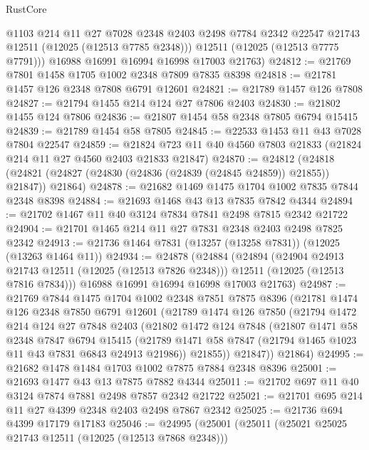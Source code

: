 \begin{lexlean}{RustCore}
\begin{coremodule}
          @1103
          @214
          @11
          @27
          @7028
          @2348
          @2403
          @2498
          @7784
          @2342
          @22547
          @21743
          @12511
          (@12025 (@12513 @7785 @2348)))
        @12511
        (@12025 (@12513 @7775 @7791)))
      @16988
      @16991
      @16994
      @16998
      @17003
      @21763)
@24812 := @21769 @7801 @1458 @1705 @1002 @2348 @7809 @7835 @8398
@24818 := @21781 @1457 @126 @2348 @7808 @6791 @12601
@24821 := @21789 @1457 @126 @7808
@24827 := @21794 @1455 @214 @124 @27 @7806 @2403
@24830 := @21802 @1455 @124 @7806
@24836 := @21807 @1454 @58 @2348 @7805 @6794 @15415
@24839 := @21789 @1454 @58 @7805
@24845 := @22533 @1453 @11 @43 @7028 @7804 @22547
@24859 := @21824 @723 @11 @40 @4560 @7803 @21833 (@21824 @214 @11 @27 @4560 @2403 @21833 @21847)
@24870 := @24812
    (@24818 (@24821 (@24827 (@24830 (@24836 (@24839 (@24845 @24859)) @21855)) @21847)) @21864)
@24878 := @21682 @1469 @1475 @1704 @1002 @7835 @7844 @2348 @8398
@24884 := @21693 @1468 @43 @13 @7835 @7842 @4344
@24894 := @21702 @1467 @11 @40 @3124 @7834 @7841 @2498 @7815 @2342 @21722
@24904 := @21701 @1465 @214 @11 @27 @7831 @2348 @2403 @2498 @7825 @2342
@24913 := @21736 @1464 @7831 (@13257 (@13258 @7831)) (@12025 (@13263 @1464 @11))
@24934 := @24878
    (@24884
      (@24894
        (@24904 @24913 @21743 @12511 (@12025 (@12513 @7826 @2348)))
        @12511
        (@12025 (@12513 @7816 @7834)))
      @16988
      @16991
      @16994
      @16998
      @17003
      @21763)
@24987 := @21769
    @7844
    @1475
    @1704
    @1002
    @2348
    @7851
    @7875
    @8396
    (@21781
      @1474
      @126
      @2348
      @7850
      @6791
      @12601
      (@21789
        @1474
        @126
        @7850
        (@21794
          @1472
          @214
          @124
          @27
          @7848
          @2403
          (@21802
            @1472
            @124
            @7848
            (@21807
              @1471
              @58
              @2348
              @7847
              @6794
              @15415
              (@21789 @1471 @58 @7847 (@21794 @1465 @1023 @11 @43 @7831 @6843 @24913 @21986))
              @21855))
          @21847))
      @21864)
@24995 := @21682 @1478 @1484 @1703 @1002 @7875 @7884 @2348 @8396
@25001 := @21693 @1477 @43 @13 @7875 @7882 @4344
@25011 := @21702 @697 @11 @40 @3124 @7874 @7881 @2498 @7857 @2342 @21722
@25021 := @21701 @695 @214 @11 @27 @4399 @2348 @2403 @2498 @7867 @2342
@25025 := @21736 @694 @4399 @17179 @17183
@25046 := @24995
    (@25001
      (@25011
        (@25021 @25025 @21743 @12511 (@12025 (@12513 @7868 @2348)))

\end{coremodule}
\end{lexlean}
